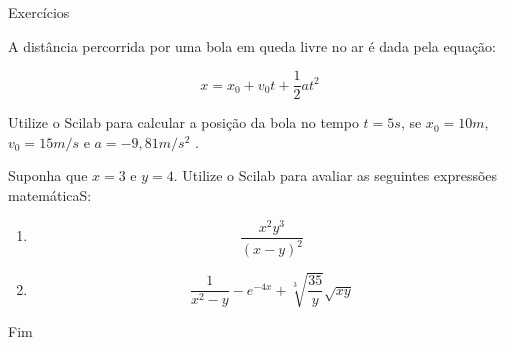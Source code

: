 \begin{frame}{Exercícios}
  \begin{exercise}
    A distância percorrida por uma bola em queda livre no ar é dada pela
    equação:

    \[ x = x_0 + v_0 t + \frac{1}{2} a t^2 \]

    Utilize o Scilab para calcular a posição da bola no tempo $t = 5 s$,
    se $x_0 = 10 m$, $v_0 = 15 m/s$ e $a = -9,81 m/s^2$ .
  \end{exercise}

  \begin{exercise}
    Suponha que $x = 3$ e $y = 4$. Utilize o Scilab para avaliar as
    seguintes expressões matemáticaS:
    \begin{enumerate}
      \item \[ \frac{x^2 y^3}{(x - y)^2} \]
      \item \[ \frac{1}{x^2 - y} - e^{-4x} + \sqrt[3]{\frac{35}{y}} \sqrt{xy} \]
    \end{enumerate}
  \end{exercise}
\end{frame}

\begin{frame}
  \begin{center}
    Fim
  \end{center}
\end{frame}



